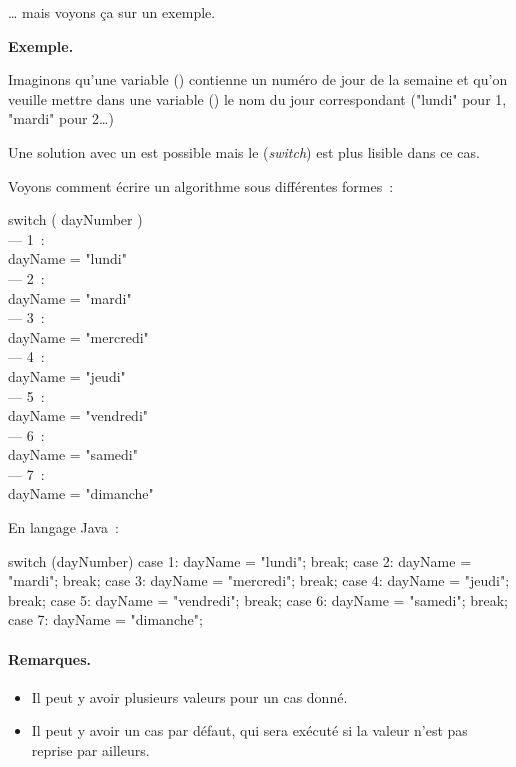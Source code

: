 	… mais voyons ça sur un exemple. 	

	\textbf{Exemple.}
	
	Imaginons qu’une variable () contienne un numéro de jour de la
	semaine et qu’on veuille mettre dans une variable () le nom du
	jour correspondant ("lundi" pour 1, "mardi" pour 2\dots)
	
	Une solution avec un  est possible 
	mais le  (\textit{switch}) est plus lisible dans ce cas.

	Voyons comment écrire un algorithme sous différentes formes~:

	\begin{langagenaturel}
		switch ( dayNumber )\\
			\tab — 1~:\\
				\tab\tab dayName = "lundi"\\
			\tab — 2~:\\
				\tab\tab dayName = "mardi"\\
			\tab — 3~:\\
				\tab\tab dayName = "mercredi"\\
			\tab — 4~:\\
				\tab\tab dayName = "jeudi"\\
			\tab — 5~:\\
				\tab\tab dayName = "vendredi"\\
			\tab — 6~:\\
				\tab\tab dayName = "samedi"\\
			\tab — 7~:\\
				\tab\tab dayName = "dimanche"
	\end{langagenaturel}

	En langage Java~:

	\begin{java}
switch (dayNumber) {
	case 1: 
		dayName = "lundi"; 
		break;
	case 2: 
		dayName = "mardi"; 
		break;
	case 3: 
		dayName = "mercredi"; 
		break;
	case 4: 
		dayName = "jeudi"; 
		break;
	case 5: 
		dayName = "vendredi"; 
		break;
	case 6: 
		dayName = "samedi"; 
		break;
	case 7: 
		dayName = "dimanche";
}
	\end{java}
		
	\paragraph{Remarques.}
	\begin{itemize}
	\item
		Il peut y avoir plusieurs valeurs pour un cas donné.
	\item
		Il peut y avoir un cas par défaut, 
		qui sera exécuté si la valeur n’est pas reprise par ailleurs.
	\end{itemize}
	
	
	
